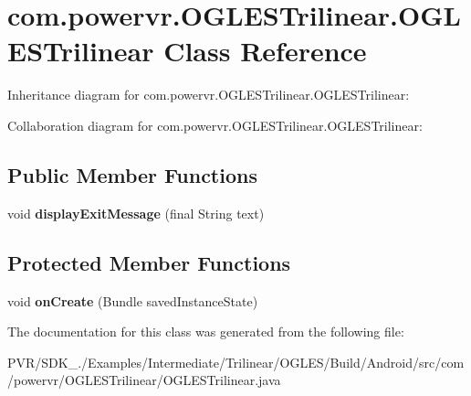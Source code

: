 \hypertarget{classcom_1_1powervr_1_1_o_g_l_e_s_trilinear_1_1_o_g_l_e_s_trilinear}{\section{com.\+powervr.\+O\+G\+L\+E\+S\+Trilinear.\+O\+G\+L\+E\+S\+Trilinear Class Reference}
\label{classcom_1_1powervr_1_1_o_g_l_e_s_trilinear_1_1_o_g_l_e_s_trilinear}
}


Inheritance diagram for com.\+powervr.\+O\+G\+L\+E\+S\+Trilinear.\+O\+G\+L\+E\+S\+Trilinear\+:


Collaboration diagram for com.\+powervr.\+O\+G\+L\+E\+S\+Trilinear.\+O\+G\+L\+E\+S\+Trilinear\+:
\subsection*{Public Member Functions}
\begin{DoxyCompactItemize}
\item 
\hypertarget{classcom_1_1powervr_1_1_o_g_l_e_s_trilinear_1_1_o_g_l_e_s_trilinear_a9fdff327016a50f15ecff052c42350ad}{void {\bfseries display\+Exit\+Message} (final String text)}\label{classcom_1_1powervr_1_1_o_g_l_e_s_trilinear_1_1_o_g_l_e_s_trilinear_a9fdff327016a50f15ecff052c42350ad}

\end{DoxyCompactItemize}
\subsection*{Protected Member Functions}
\begin{DoxyCompactItemize}
\item 
\hypertarget{classcom_1_1powervr_1_1_o_g_l_e_s_trilinear_1_1_o_g_l_e_s_trilinear_aa1d219ce32b2c2efe845a3770ec85366}{void {\bfseries on\+Create} (Bundle saved\+Instance\+State)}\label{classcom_1_1powervr_1_1_o_g_l_e_s_trilinear_1_1_o_g_l_e_s_trilinear_aa1d219ce32b2c2efe845a3770ec85366}

\end{DoxyCompactItemize}


The documentation for this class was generated from the following file\+:\begin{DoxyCompactItemize}
\item 
P\+V\+R/\+S\+D\+K\+\_./\+Examples/\+Intermediate/\+Trilinear/\+O\+G\+L\+E\+S/\+Build/\+Android/src/com/powervr/\+O\+G\+L\+E\+S\+Trilinear/O\+G\+L\+E\+S\+Trilinear.\+java\end{DoxyCompactItemize}
